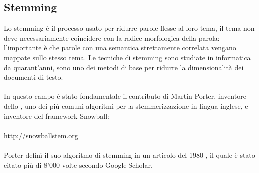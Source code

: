 \documentclass{article}
\theoremstyle{plain}
\theoremstyle{definition}
\begin{document}
\subsection{Stemming}
Lo stemming è il processo usato per ridurre parole flesse al loro tema, il tema non deve necessariamente coincidere con la radice morfologica della parola: l'importante è che parole con una semantica strettamente correlata vengano mappate sullo stesso tema. Le tecniche di stemming sono studiate in informatica da quarant'anni, sono uno dei metodi di base per ridurre la dimensionalità dei documenti di testo.
\\
\\
In questo campo è stato fondamentale il contributo di Martin Porter, inventore dello , uno dei più comuni algoritmi per la stemmerizzazione in lingua inglese, e inventore del framework Snowball:
\\
\\
\url{http://snowballstem.org}
\\
\\
Porter definì il suo algoritmo di stemming in un articolo del 1980 , il quale è stato citato più di 8'000 volte secondo Google Scholar.
\end{document}
